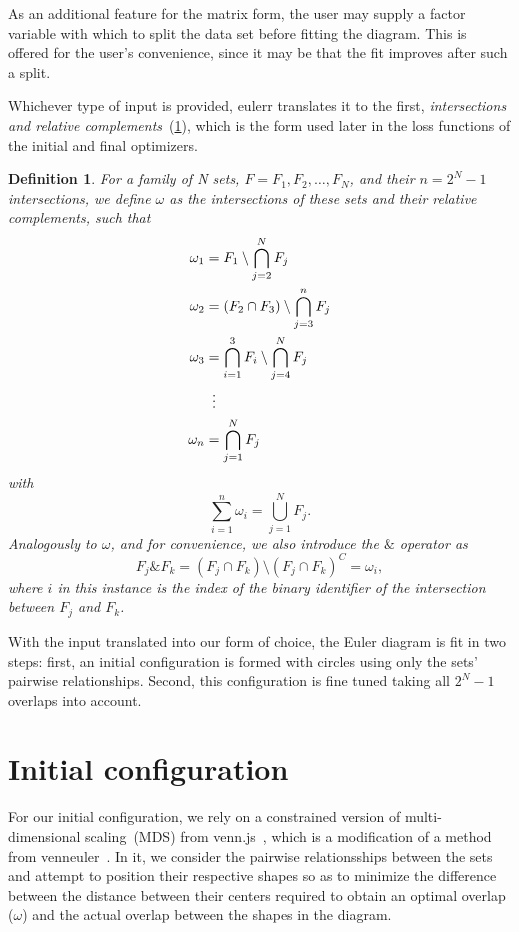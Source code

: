 \documentclass[
  oneside,
  openany,
  numbers=noendperiod,
  parskip=half,
  bibliography=totoc
]{scrbook}\usepackage[]{graphicx}\usepackage{xcolor}
\newcommand{\pkg}[1]{{\fontseries{b}\selectfont #1}}
\newtheorem{mydef}{Definition}[chapter]
\begin{document}
As an additional feature for the matrix form, the user may supply a factor
variable with which to split the data set before fitting the diagram. This is
offered for the user's convenience, since it may be
that the fit improves after such a split.

Whichever type of input is provided, \pkg{eulerr} translates it to the first,
\emph{intersections and relative complements}~(\cref{def:omega}), which is the
form used later in the loss functions of the initial and final optimizers.

\begin{mydef}
\label{def:omega}
For a family of \emph{N} sets, $F = F_1, F_2, \dots, F_N$, and their $n=2^N-1$
intersections, we define $\omega$ as the intersections of these sets and their
relative complements, such that
\begin{align*}
  \omega_{1} & = F_1 \setminus \bigcap_{j=2}^N F_j  \\
  \omega_{2} & = (F_2 \cap F_3) \setminus \bigcap_{j=3}^{n} F_j\\
  \omega_{3} & = \bigcap_{i=1}^3 F_i \setminus \bigcap_{j=4}^{N} F_j\\
             & \vdotswithin{=} \\
    \omega_n & = \bigcap_{j=1}^{N}F_j
\end{align*}
with
\[
  \sum_{i = 1}^n \omega_i =  \bigcup_{j=1}^N F_j.
\]
Analogously to $\omega$, and for convenience, we also introduce the $\&$
operator as
\[
  F_j \& F_k = (F_j \cap F_k)\setminus (F_j \cap F_k)^C = \omega_{i},
\]
where $i$ in this instance is the index of the binary identifier of the
intersection between $F_j$ and $F_k$.
\end{mydef}

With the input translated into our form of choice, the Euler diagram is fit in two
steps: first, an initial configuration is formed with circles using only the
sets' pairwise relationships. Second, this configuration is fine tuned taking
all $2^N-1$ overlaps into account.

\section{Initial configuration}
\label{sec:initConfig}

For our initial configuration, we rely on a constrained version of
multi-dimensional scaling~(MDS) from \pkg{venn.js}~\citep{Frederickson_2016},
which is a modification of a method from \pkg{venneuler}~\citep{Wilkinson_2012}.
In it, we consider the pairwise relationsships between the sets and attempt to
position their respective shapes so as to minimize the difference between the
distance between their centers required to obtain an optimal overlap ($\omega$)
and the actual overlap between the shapes in the diagram.
\end{document}
